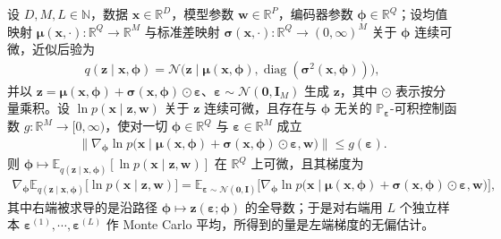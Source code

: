 \documentclass[../../main.tex]{subfiles}
\begin{document}
\begin{proposition}[重参数化梯度估计的无偏性]\label{proposition:ch19-重参数化梯度}
设 $D,M,L\in\mathbb{N}$，数据 $\bm{x}\in\mathbb{R}^{D}$，模型参数 $\bm{w}\in\mathbb{R}^{P}$，编码器参数 $\bm{\phi}\in\mathbb{R}^{Q}$；设均值映射 $\bm{\mu}(\bm{x},\cdot):\mathbb{R}^{Q}\to\mathbb{R}^{M}$ 与标准差映射 $\bm{\sigma}(\bm{x},\cdot):\mathbb{R}^{Q}\to(0,\infty)^{M}$ 关于 $\bm{\phi}$ 连续可微，近似后验为
\begin{align*}
q(\bm{z}\mid\bm{x},\bm{\phi})=\mathcal{N}\big(\bm{z}\mid\bm{\mu}(\bm{x},\bm{\phi}),\operatorname{diag}(\bm{\sigma}^{2}(\bm{x},\bm{\phi}))\big),
\end{align*}
并以 $\bm{z}=\bm{\mu}(\bm{x},\bm{\phi})+\bm{\sigma}(\bm{x},\bm{\phi})\odot\bm{\varepsilon}$、$\bm{\varepsilon}\sim\mathcal{N}(\bm{0},\bm{I}_{M})$ 生成 $\bm{z}$，其中 $\odot$ 表示按分量乘积。设 $\ln p(\bm{x}\mid\bm{z},\bm{w})$ 关于 $\bm{z}$ 连续可微，且存在与 $\bm{\phi}$ 无关的 $\mathbb{P}_{\bm{\varepsilon}}$-可积控制函数 $g:\mathbb{R}^{M}\to[0,\infty)$，使对一切 $\bm{\phi}\in\mathbb{R}^{Q}$ 与 $\bm{\varepsilon}\in\mathbb{R}^{M}$ 成立
\begin{align*}
\big\|\nabla_{\bm{\phi}}\ln p\big(\bm{x}\mid\bm{\mu}(\bm{x},\bm{\phi})+\bm{\sigma}(\bm{x},\bm{\phi})\odot\bm{\varepsilon},\bm{w}\big)\big\|\leqslant g(\bm{\varepsilon}).
\end{align*}
则 $\bm{\phi}\mapsto\mathbb{E}_{q(\bm{z}\mid\bm{x},\bm{\phi})}[\ln p(\bm{x}\mid\bm{z},\bm{w})]$ 在 $\mathbb{R}^{Q}$ 上可微，且其梯度为
\begin{align*}
\nabla_{\bm{\phi}}\mathbb{E}_{q(\bm{z}\mid\bm{x},\bm{\phi})}\big[\ln p(\bm{x}\mid\bm{z},\bm{w})\big]=\mathbb{E}_{\bm{\varepsilon}\sim\mathcal{N}(\bm{0},\bm{I})}\big[\nabla_{\bm{\phi}}\ln p\big(\bm{x}\mid\bm{\mu}(\bm{x},\bm{\phi})+\bm{\sigma}(\bm{x},\bm{\phi})\odot\bm{\varepsilon},\bm{w}\big)\big],
\end{align*}
其中右端被求导的是沿路径 $\bm{\phi}\mapsto\bm{z}(\bm{\varepsilon};\bm{\phi})$ 的全导数；于是对右端用 $L$ 个独立样本 $\bm{\varepsilon}^{(1)},\cdots,\bm{\varepsilon}^{(L)}$ 作 Monte Carlo 平均，所得到的量是左端梯度的无偏估计。
\end{proposition}
\end{document}
